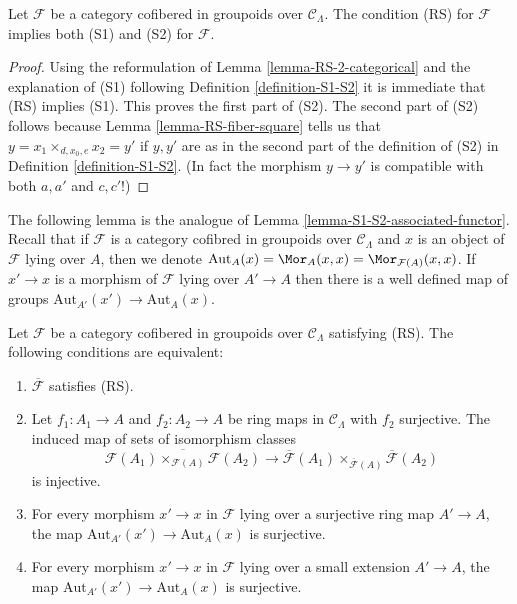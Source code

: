 \begin{lemma}
\label{lemma-RS-implies-S1-S2}
Let $\mathcal{F}$ be a category cofibered in groupoids over
$\mathcal{C}_\Lambda$. The condition (RS) for $\mathcal{F}$
implies both (S1) and (S2) for $\mathcal{F}$.
\end{lemma}

\begin{proof}
Using the reformulation of
Lemma \ref{lemma-RS-2-categorical}
and the explanation of (S1) following
Definition \ref{definition-S1-S2}
it is immediate that (RS) implies (S1).
This proves the first part of (S2). The second part of (S2)
follows because
Lemma \ref{lemma-RS-fiber-square}
tells us that $y = x_1 \times_{d, x_0, e} x_2 = y'$ if
$y, y'$ are as in the second part of the definition of (S2) in
Definition \ref{definition-S1-S2}. (In fact the morphism
$y \to y'$ is compatible with both $a, a'$ and $c, c'$!)
\end{proof}

\noindent
The following lemma is the analogue of
Lemma \ref{lemma-S1-S2-associated-functor}.
Recall that if $\mathcal{F}$ is a category cofibred in groupoids over
$\mathcal{C}_\Lambda$ and $x$ is an object of $\mathcal{F}$
lying over $A$, then we denote
$\text{Aut}_A(x) = \Mor_A(x, x) = \Mor_{\mathcal{F}(A)}(x, x)$.
If $x' \to x$ is a morphism of $\mathcal{F}$ lying over $A' \to A$
then there is a well defined map of groups
$\text{Aut}_{A'}(x') \to \text{Aut}_A(x)$.

\begin{lemma}
\label{lemma-RS-associated-functor}
Let $\mathcal{F}$ be a category cofibered in groupoids over
$\mathcal{C}_\Lambda$ satisfying (RS).
The following conditions are equivalent:
\begin{enumerate}
\item $\overline{\mathcal{F}}$ satisfies (RS).
\item Let $f_1: A_1 \to A$ and $f_2: A_2 \to A$ be ring maps in
$\mathcal{C}_\Lambda$ with $f_2$ surjective. The induced map
of sets of isomorphism classes
$$
\overline{\mathcal{F}(A_1) \times_{\mathcal{F}(A)} \mathcal{F}(A_2)}
\to \overline{\mathcal{F}}(A_1) \times_{\overline{\mathcal{F}}(A)}
\overline{\mathcal{F}}(A_2)
$$
is injective.
\item For every morphism $x' \to x$ in $\mathcal{F}$ lying over a
surjective ring map $A' \to A$, the map
$\text{Aut}_{A'}(x') \to \text{Aut}_A(x)$ is surjective.
\item For every morphism $x' \to x$ in $\mathcal{F}$ lying over a small
extension $A' \to A$, the map
$\text{Aut}_{A'}(x') \to \text{Aut}_A(x)$ is surjective.
\end{enumerate}
\end{lemma}


